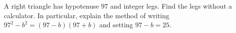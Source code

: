 A right triangle has hypotenuse $97$ and integer legs. Find the legs without a calculator. In particular, explain the method of writing $97^2-b^2=(97-b)(97+b)$ and setting $97-b=25$.
